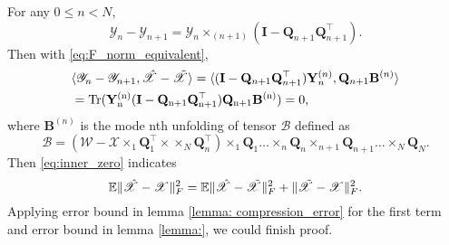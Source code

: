 For any $0\le n< N$, 
\begin{equation}
\mathscr{Y}_n-\mathscr{Y}_{n+1} = \mathscr{Y}_{n} \times_{(n+1)} (\mathbf{I} - \mathbf{Q}_{n+1}\mathbf{Q}^\top_{n+1}).
\end{equation}
Then with \eqref{eq:F_norm_equivalent}, 
\begin{equation}
\begin{aligned}
&\langle \mathscr{Y}_n-\mathscr{Y}_{n+1}, \mathscr{\hat{X}}-\tilde{\mathscr{X}}\rangle = \langle (\mathbf{I} - \mathbf{Q}_{n+1}\mathbf{Q}^\top_{n+1}) \mathbf{Y}_{n}^{(n)},  \mathbf{Q}_{n+1}\mathbf{B}^{(n)}\rangle \\
& = \rm{Tr}(\mathbf{Y}_{n}^{(n)} (\mathbf{I} - \mathbf{Q}_{n+1}\mathbf{Q}^\top_{n+1})\mathbf{Q}_{n+1}\mathbf{B}^{(n)} )=0 , 
\end{aligned}
\end{equation}
where $\mathbf{B}^{(n)}$ is the mode nth unfolding of tensor $\mathscr{B}$ defined as 
\begin{equation}
\mathscr{B} = (\mathscr{W}-\mathscr{X}\times_1 \mathbf{Q}_1^\top \times \times_N \mathbf{Q}_n^\top)  \times_1 \mathbf{Q}_1 \dots \times_n \mathbf{Q}_n \times_{n+1}  \mathbf{Q}_{n+1} \dots \times_N   \mathbf{Q}_{N}. 
\end{equation}
Then \eqref{eq:inner_zero} indicates 
\begin{equation}
 \mathbb{E}\| \hat{\mathscr{X}} - \mathscr{X} \|_F^2 = \mathbb{E}\| \hat{\mathscr{X}} - \Tilde{\mathscr{X}}\|_F^2 + \|\Tilde{\mathscr{X}} - \mathscr{X} \|_F^2. 
\end{equation}
Applying error bound in lemma \ref{lemma: compression_error} for the first term and error bound in lemma \ref{lemma:}, we could finish proof. 


